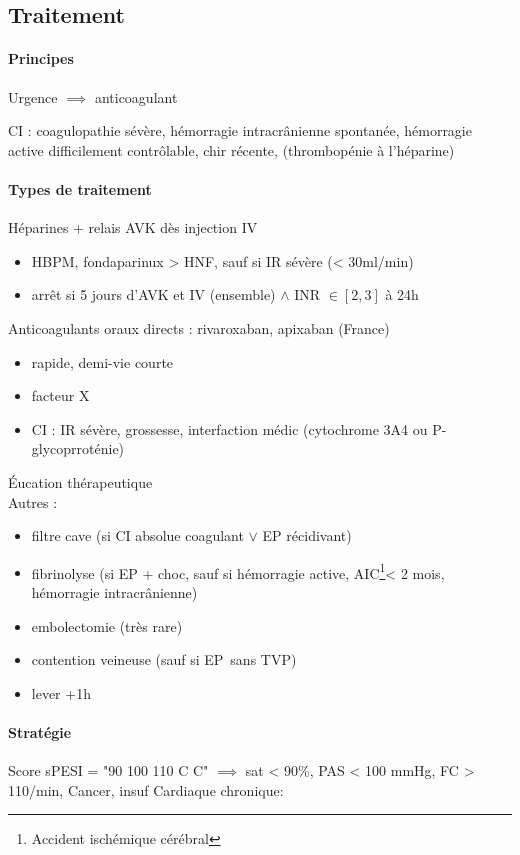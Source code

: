 \subsection{Traitement}
\paragraph{Principes}
Urgence \skull $\implies$ anticoagulant

CI : coagulopathie sévère, hémorragie intracrânienne spontanée, hémorragie
active difficilement contrôlable, chir récente, (thrombopénie à l'héparine)

\paragraph{Types de traitement}
Héparines + relais AVK dès injection IV
\begin{itemize}
  \item HBPM, fondaparinux > HNF, sauf si IR sévère (< 30ml/min)
  \item arrêt si 5 jours d'AVK et IV (ensemble) $\wedge$ INR $\in [2,3]$ à 24h
\end{itemize}
Anticoagulants oraux directs : rivaroxaban, apixaban (France)
\begin{itemize}
  \item rapide, demi-vie courte
  \item facteur X
  \item CI : IR sévère, grossesse, interfaction médic (cytochrome 3A4 ou
    P-glycoprroténie)
\end{itemize}
Éucation thérapeutique\\
Autres :
\begin{itemize}
  \item filtre cave (si CI absolue coagulant $\vee$ EP récidivant)
  \item fibrinolyse (si EP + choc, sauf si hémorragie active,
    AIC\footnote{Accident ischémique cérébral}< 2 mois,
    hémorragie intracrânienne)
  \item embolectomie (très rare)
  \item contention veineuse (sauf si EP sans TVP)
  \item lever +1h
\end{itemize}

\paragraph{Stratégie}
Score sPESI = "90 100 110 C C" $\implies$ sat < 90\%, PAS < 100 mmHg, FC >
110/min, Cancer, insuf Cardiaque chronique:

